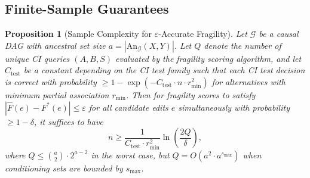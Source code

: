 \documentclass[11pt,a4paper]{article}
\newtheorem{proposition}[theorem]{Proposition}
\theoremstyle{definition}
\theoremstyle{remark}
\newcommand{\DAG}{\mathcal{G}}
\newcommand{\An}{\mathrm{An}}
\newcommand{\fragility}{F}
\begin{document}
\subsection{Finite-Sample Guarantees}\label{sec:finite_sample}

\begin{proposition}[Sample Complexity for $\varepsilon$-Accurate Fragility]\label{prop:sample_complexity}
Let $\DAG$ be a causal DAG with ancestral set size $a = |\An_\DAG(X,Y)|$.
Let $Q$ denote the number of unique CI queries $(A, B, S)$ evaluated by
the fragility scoring algorithm, and let $C_{\mathrm{test}}$ be a constant
depending on the CI test family such that each CI test decision is correct
with probability $\geq 1 - \exp(-C_{\mathrm{test}} \cdot n \cdot r_{\min}^2)$
for alternatives with minimum partial association $r_{\min}$. Then for
fragility scores to satisfy $|\hat{\fragility}(e) - \fragility^*(e)| \leq
\varepsilon$ for all candidate edits $e$ simultaneously with probability
$\geq 1 - \delta$, it suffices to have
\[
  n \geq \frac{1}{C_{\mathrm{test}} \cdot r_{\min}^2}
  \ln\!\left(\frac{2Q}{\delta}\right),
\]
where $Q \leq \binom{a}{2} \cdot 2^{a-2}$ in the worst case, but
$Q = O(a^2 \cdot a^{s_{\max}})$ when conditioning sets are bounded by
$s_{\max}$.
\end{proposition}
\end{document}
